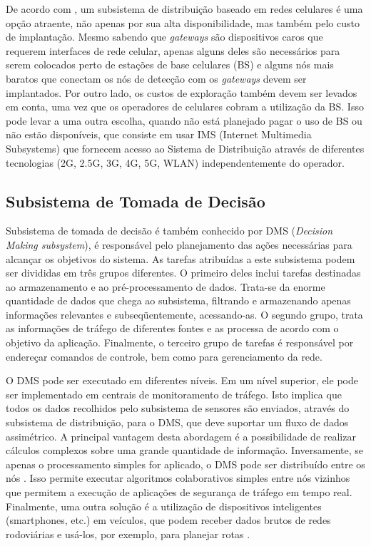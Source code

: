 \documentclass[
	12pt,				%
	oneside,			%
	a4paper,			%
	english,			%
	brazil				%
	]{abntex2ppgsi}
\begin{document}
De acordo com , um subsistema de distribuição baseado em redes celulares é uma opção atraente, não apenas por sua alta disponibilidade, mas também pelo custo de implantação. Mesmo sabendo que \textit{gateways} são dispositivos caros que requerem interfaces de rede celular, apenas alguns deles são necessários para serem colocados perto de estações de base celulares (BS) e alguns nós mais baratos que conectam os nós de detecção com os \textit{gateways} devem ser implantados. Por outro lado, os custos de exploração também devem ser levados em conta, uma vez que os operadores de celulares cobram a utilização da BS. Isso pode levar a uma outra escolha, quando não está planejado pagar o uso de BS ou não estão disponíveis, que consiste em usar IMS (Internet Multimedia Subsystems) \cite{birk2009iroad} que fornecem acesso ao Sistema de Distribuição através de diferentes tecnologias (2G, 2.5G, 3G, 4G, 5G, WLAN) independentemente do operador.

\subsection{Subsistema de Tomada de Decisão}

Subsistema de tomada de decisão é também conhecido por DMS (\textit{Decision Making subsystem}), é responsável pelo planejamento das ações necessárias para alcançar os objetivos do sistema. As tarefas atribuídas a este subsistema podem ser divididas em três grupos diferentes. O primeiro deles inclui tarefas destinadas ao armazenamento e ao pré-processamento de dados. Trata-se da enorme quantidade de dados que chega ao subsistema, filtrando e armazenando apenas informações relevantes e subseqüentemente, acessando-as. O segundo grupo, trata as informações de tráfego de diferentes fontes e as processa de acordo com o objetivo da aplicação. Finalmente, o terceiro grupo de tarefas é responsável por endereçar comandos de controle, bem como para gerenciamento da rede.

O DMS pode ser executado em diferentes níveis. Em um nível superior, ele pode ser implementado em centrais de monitoramento de tráfego. Isto implica que todos os dados recolhidos pelo subsistema de sensores são enviados, através do subsistema de distribuição, para o DMS, que deve suportar um fluxo de dados assimétrico. A principal vantagem desta abordagem é a possibilidade de realizar cálculos complexos sobre uma grande quantidade de informação. Inversamente, se apenas o processamento simples for aplicado, o DMS pode ser distribuído entre os nós . Isso permite executar algoritmos colaborativos simples entre nós vizinhos que permitem a execução de aplicações de segurança de tráfego em tempo real. Finalmente, uma outra solução é a utilização de dispositivos inteligentes (smartphones, etc.) em veículos, que podem receber dados brutos de redes rodoviárias e usá-los, por exemplo, para planejar rotas \cite{losilla2011comprehensive}.
\end{document}
